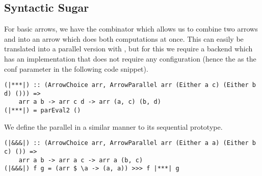 \subsection{Syntactic Sugar} \label{syntacticSugar}
For basic arrows, we have the \code{***} combinator which allows us to combine two arrows  and  into an arrow  which does both computations at once. This can easily be translated into a parallel version with , but for this we require a backend which has an implementation that does not require any configuration (hence the \code{()} as the conf parameter in the following code snippet).
\begin{lstlisting}[frame=htrbl]
(|***|) :: (ArrowChoice arr, ArrowParallel arr (Either a c) (Either b d) ())) =>
	arr a b -> arr c d -> arr (a, c) (b, d)
(|***|) = parEval2 ()
\end{lstlisting}
We define the parallel \code{|&&&|} in a similar manner to its sequential prototype.
\begin{lstlisting}[frame=htrbl]
(|&&&|) :: (ArrowChoice arr, ArrowParallel arr (Either a a) (Either b c) ()) =>
	arr a b -> arr a c -> arr a (b, c)
(|&&&|) f g = (arr $ \a -> (a, a)) >>> f |***| g
\end{lstlisting} %